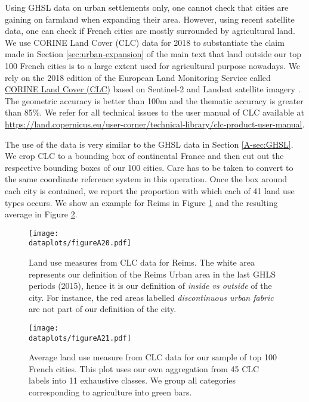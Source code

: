 \documentclass[11pt]{report}
\newcommand{\dataplots}{../output/data/plots}
\begin{document}
Using GHSL data on urban settlements only, one cannot check that cities are gaining on farmland when expanding their area. However, using recent satellite data, one can check if French cities are mostly surrounded by agricultural land. We use CORINE Land Cover (CLC) data for 2018 to substantiate the claim made in Section \ref{sec:urban-expansion} of the main text that land outside our top 100 French cities is to a large extent used for agricultural purpose nowadays. We rely on the 2018 edition of the European Land Monitoring Service called \href{https://land.copernicus.eu/pan-european/corine-land-cover/clc2018}{CORINE Land Cover (CLC)} based on Sentinel-2 and Landsat satellite imagery \cite{CLC}. The geometric accuracy is better than 100m and the thematic accuracy is greater than 85\%. We refer for all technical issues to the user manual of CLC available at \url{https://land.copernicus.eu/user-corner/technical-library/clc-product-user-manual}.

The use of the data is very similar to the GHSL data in Section \ref{A-sec:GHSL}. We crop CLC to a bounding box of continental France and then cut out the respective bounding boxes of our 100 cities. Care has to be taken to convert to the same coordinate reference system in this operation. Once the box around each city is contained, we report the proportion with which each of 41 land use types occurs. We show an example for Reims in Figure \ref{A-fig:CLC-paris} and the resulting average in Figure \ref{A-fig:CLC}.

\begin{figure}[h!]
	\centering
	\texttt{[image: \\dataplots/figureA20.pdf]}
	\caption{Land use measures from CLC data for Reims. The white area represents our definition of the Reims Urban area in the last GHLS periods (2015), hence it is our definition of \emph{inside vs outside} of the city. For instance, the red areas labelled \emph{discontinuous urban fabric} are not part of our definition of the city.\label{A-fig:CLC-paris}}
\end{figure}


\begin{figure}[h!]
	\texttt{[image: \\dataplots/figureA21.pdf]}
	\caption{Average land use measure from CLC data for our sample of top 100 French cities. This plot uses our own aggregation from 45 CLC labels into 11 exhaustive classes. We group all categories corresponding to agriculture into green bars.\label{A-fig:CLC}}
\end{figure}
\end{document}
